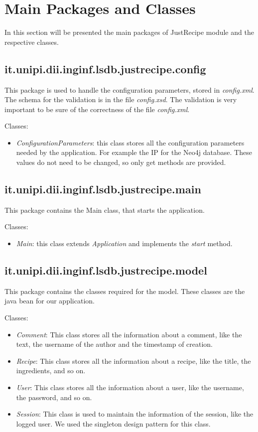 \documentclass[a4paper]{report}
\begin{document}
\section{Main Packages and Classes}
In this section will be presented the main packages of JustRecipe module and the respective classes.
\subsection {it.unipi.dii.inginf.lsdb.justrecipe.config}
This package is used to handle the configuration parameters, stored in \emph{config.xml}. The schema for the validation is in the file \emph{config.xsd}. The validation is very important to be sure of the correctness of the file \emph{config.xml}.

\noindent Classes:
 \begin{itemize}
	\item \emph{ConfigurationParameters}: this class stores all the configuration parameters needed by the application. For example the IP for the Neo4j database. These values do not need to be changed, so only get methods are provided. 
\end{itemize}
\subsection {it.unipi.dii.inginf.lsdb.justrecipe.main}
This package contains the Main class, that starts the application.

\noindent Classes:
 \begin{itemize}
	\item \emph{Main}: this class extends \emph{Application} and implements the \emph{start} method. 
\end{itemize}
\subsection{it.unipi.dii.inginf.lsdb.justrecipe.model}
This package contains the classes required for the model. These classes are the java bean for our application.

\noindent Classes:
  \begin{itemize}
	\item \emph{Comment}: This class stores all the information about a comment, like the text, the username of the author and the timestamp of creation. 
	\item \emph{Recipe}: This class stores all the information about a recipe, like the title, the ingredients, and so on.
	\item \emph{User}: This class stores all the information about a user, like the username, the password, and so on.
	\item \emph{Session}: This class is used to maintain the information of the session, like the logged user. We used the singleton design pattern for this class.
\end{itemize}
\end{document}
